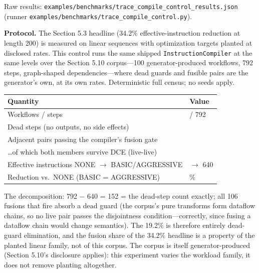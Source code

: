 \documentclass[
  11pt,
]{article}
\newcounter{none} %
\begin{document}
Raw results:
\texttt{examples/benchmarks/trace\_compile\_control\_results.json}
(runner \texttt{examples/benchmarks/trace\_compile\_control.py}).

\textbf{Protocol.} The Section 5.3 headline (34.2\%
effective-instruction reduction at length 200) is measured on linear
sequences with optimization targets planted at disclosed rates. This
control runs the same shipped \texttt{InstructionCompiler} at the same
levels over the Section 5.10 corpus---100 generator-produced workflows,
792 steps, graph-shaped dependencies---where dead guards and fusible
pairs are the generator's own, at its own rates. Deterministic full
census; no seeds apply.

{\def\LTcaptype{none} %
\begin{longtable}[]{@{}
  >{\raggedright\arraybackslash}p{}
  >{\raggedright\arraybackslash}p{}@{}}
\toprule\noalign{}
\begin{minipage}[b]{\linewidth}\raggedright
Quantity
\end{minipage} & \begin{minipage}[b]{\linewidth}\raggedright
Value
\end{minipage} \\
\midrule\noalign{}
\endhead
\bottomrule\noalign{}
\endlastfoot
Workflows / steps & 100 / 792 \\
Dead steps (no outputs, no side effects) & 152 \\
Adjacent pairs passing the compiler's fusion gate & 106 \\
\ldots of which both members survive DCE (live-live) & 0 \\
Effective instructions NONE \(\rightarrow\) BASIC/AGGRESSIVE & 792
\(\rightarrow\) 640 \\
Reduction vs.~NONE (BASIC = AGGRESSIVE) & 19.2\% \\
\end{longtable}
}

The decomposition: 792 − 640 = 152 = the dead-step count exactly; all
106 fusions that fire absorb a dead guard (the corpus's pure transforms
form dataflow chains, so no live pair passes the disjointness
condition---correctly, since fusing a dataflow chain would change
semantics). The 19.2\% is therefore entirely dead-guard elimination, and
the fusion share of the 34.2\% headline is a property of the planted
linear family, not of this corpus. The corpus is itself
generator-produced (Section 5.10's disclosure applies): this experiment
varies the workload family, it does not remove planting altogether.
\end{document}
